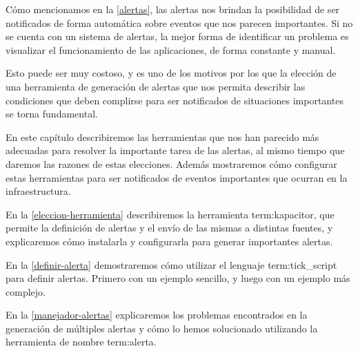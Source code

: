 Cómo mencionamos en la \autoref{alertas}, las alertas nos brindan la
posibilidad de ser notificados de forma automática sobre eventos que nos
parecen importantes.  Si no se cuenta con un sistema de alertas, la mejor forma
de identificar un problema es visualizar el funcionamiento de las aplicaciones,
de forma constante y manual.

Esto puede ser muy costoso, y es uno de los motivos por los que la elección de
una herramienta de generación de alertas que nos permita describir las
condiciones que deben complirse para ser notificados de situaciones importantes
se torna fundamental.

En este capítulo describiremos las herramientas que nos han parecido más
adecuadas para resolver la importante tarea de las alertas, al mismo tiempo que
daremos las razones de estas elecciones. Además mostraremos cómo configurar
estas herramientas para ser notificados de eventos importantes que ocurran en
la infraestructura.

En la \autoref{eleccion-herramienta} describiremos la herramienta
\gls{term:kapacitor}, que permite la definición de alertas y el envío de las
mismas a distintas fuentes, y explicaremos cómo instalarla y configurarla para
generar importantes alertas.

En la \autoref{definir-alerta} demostraremos cómo utilizar el lenguaje
\gls{term:tick_script} para definir alertas. Primero con un ejemplo sencillo, y luego con
un ejemplo más complejo.

En la \autoref{manejador-alertas} explicaremos los problemas encontrados en la
generación de múltiples alertas y cómo lo hemos solucionado utilizando la
herramienta de nombre \gls{term:alerta}.
